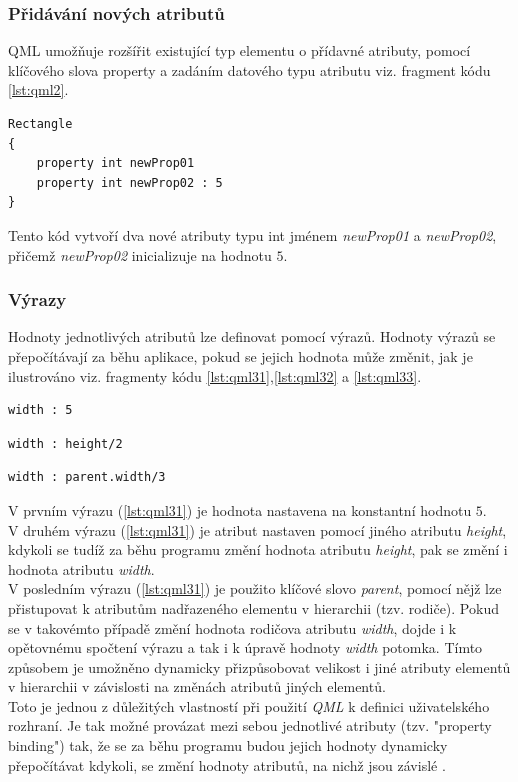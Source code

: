\documentclass[11pt,twoside,a4paper]{book}
\begin{document}
\subsubsection{Přidávání nových atributů}
QML umožňuje rozšířit existující typ elementu o přídavné atributy, pomocí klíčového slova property a zadáním  datového typu atributu viz. fragment kódu \ref{lst:qml2}.
\begin{lstlisting}[frame=single,caption=Ukázka deklarace dvou nových atributů.,label=lst:qml2]
Rectangle
{
	property int newProp01
	property int newProp02 : 5
}
\end{lstlisting}
Tento kód vytvoří dva nové atributy typu int jménem \textit{newProp01} a \textit{newProp02}, přičemž \textit{newProp02} inicializuje na hodnotu $5$.
\subsubsection{Výrazy}
Hodnoty jednotlivých atributů lze definovat pomocí výrazů. Hodnoty výrazů se přepočítávají za běhu aplikace, pokud se jejich hodnota může změnit, jak je ilustrováno viz. fragmenty kódu \ref{lst:qml31},\ref{lst:qml32} a \ref{lst:qml33}.
\begin{lstlisting}[frame=single,caption=Výraz ilustrující přiřazení konstanty.,label=lst:qml31]
	width : 5
\end{lstlisting}
\begin{lstlisting}[frame=single,caption=Výraz ilustrující přiřazení hodnoty jiného atributu.,label=lst:qml32]
	width : height/2
\end{lstlisting}
\begin{lstlisting}[frame=single,caption=Výraz ilustrující přiřazení hodnoty atributu jiného elementu.,label=lst:qml33]
	width : parent.width/3
\end{lstlisting}
V prvním výrazu (\ref{lst:qml31}) je hodnota nastavena na konstantní hodnotu $5$.\\
V druhém výrazu (\ref{lst:qml31}) je atribut nastaven pomocí jiného atributu \textit{height}, kdykoli se tudíž za běhu programu změní hodnota atributu \textit{height}, pak se změní i hodnota atributu \textit{width}.\\
V posledním výrazu (\ref{lst:qml31}) je použito klíčové slovo \textit{parent}, pomocí nějž lze přistupovat k atributům nadřazeného elementu v hierarchii (tzv. rodiče). Pokud se v takovémto případě změní hodnota rodičova atributu \textit{width}, dojde i k opětovnému spočtení výrazu a tak i k úpravě hodnoty \textit{width} potomka. Tímto způsobem je umožněno dynamicky přizpůsobovat velikost i jiné atributy elementů v hierarchii v závislosti na změnách atributů jiných elementů.\\
Toto je jednou z důležitých vlastností při použití \textit{QML} k definici uživatelského rozhraní. Je tak možné provázat mezi sebou jednotlivé atributy (tzv. "property binding") tak, že se za běhu programu budou jejich hodnoty dynamicky přepočítávat kdykoli, se změní hodnoty atributů, na nichž jsou závislé .
\end{document}
